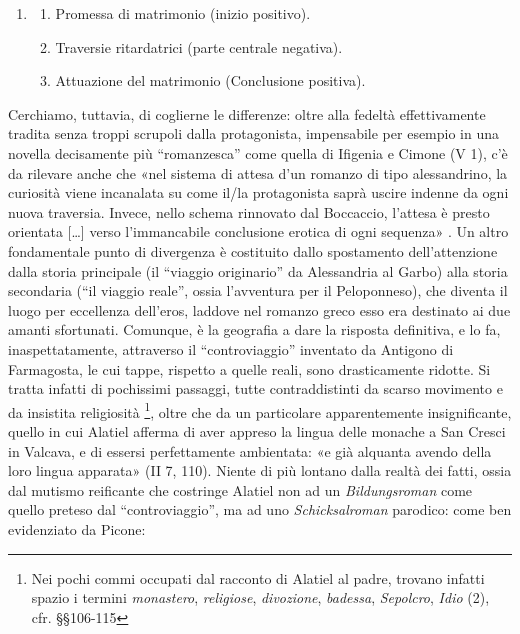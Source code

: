 \begin{enumerate}
\def\labelenumi{(\arabic{enumi})}
\setcounter{enumi}{1}
\item
  \begin{enumerate}
  \def\labelenumii{(\roman{enumii})}
  \tightlist
  \item
    Promessa di matrimonio (inizio positivo).
  \item
    Traversie ritardatrici (parte centrale negativa).
  \item
    Attuazione del matrimonio (Conclusione positiva).
  \end{enumerate}
\end{enumerate}

Cerchiamo, tuttavia, di coglierne le differenze: oltre alla fedeltà
effettivamente tradita senza troppi scrupoli dalla protagonista,
impensabile per esempio in una novella decisamente più ``romanzesca''
come quella di Ifigenia e Cimone (V 1), c'è da rilevare anche che «nel
sistema di attesa d'un romanzo di tipo alessandrino, la curiosità viene
incanalata su come il/la protagonista saprà uscire indenne da ogni nuova
traversia. Invece, nello schema rinnovato dal Boccaccio, l'attesa è
presto orientata {[}\ldots{}{]} verso l'immancabile conclusione erotica
di ogni sequenza» \autocite[p.~151]{segre1974}. Un altro fondamentale
punto di divergenza è costituito dallo spostamento dell'attenzione dalla
storia principale (il ``viaggio originario'' da Alessandria al Garbo)
alla storia secondaria (``il viaggio reale'', ossia l'avventura per il
Peloponneso), che diventa il luogo per eccellenza dell'eros, laddove nel
romanzo greco esso era destinato ai due amanti sfortunati. Comunque, è
la geografia a dare la risposta definitiva, e lo fa, inaspettatamente,
attraverso il ``controviaggio'' inventato da Antigono di Farmagosta, le
cui tappe, rispetto a quelle reali, sono drasticamente ridotte. Si
tratta infatti di pochissimi passaggi, tutte contraddistinti da scarso
movimento e da insistita religiosità \footnote{Nei pochi commi occupati
  dal racconto di Alatiel al padre, trovano infatti spazio i termini
  \emph{monastero}, \emph{religiose}, \emph{divozione}, \emph{badessa},
  \emph{Sepolcro}, \emph{Idio} (2), cfr. §§106-115}, oltre che da un
particolare apparentemente insignificante, quello in cui Alatiel afferma
di aver appreso la lingua delle monache a San Cresci in Valcava, e di
essersi perfettamente ambientata: «e già alquanta avendo della loro
lingua apparata» (II 7, 110). Niente di più lontano dalla realtà dei
fatti, ossia dal mutismo reificante che costringe Alatiel non ad un
\emph{Bildungsroman} come quello preteso dal ``controviaggio'', ma ad
uno \emph{Schicksalroman} parodico: come ben evidenziato da Picone:

